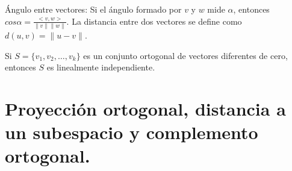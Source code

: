 
\begin{defin}
\'Angulo entre vectores: Si el ángulo formado por $v$ y $w$ mide $\alpha$, entonces $ cos \alpha =\frac{<v, w>}{\|v\|\| w\|}.$
La distancia entre dos vectores se define como $d(u,v)=\|u-v\|.$
\end{defin}


\begin{thm}
Si $S = \{ v_1,v_2, \dots, v_k  \}$ es un conjunto ortogonal de vectores diferentes de cero, entonces $S$ es linealmente independiente.
\end{thm}

















\section[Proyecci\'on ortogonal]{Proyecci\'on ortogonal, distancia a un subespacio y complemento ortogonal.}


